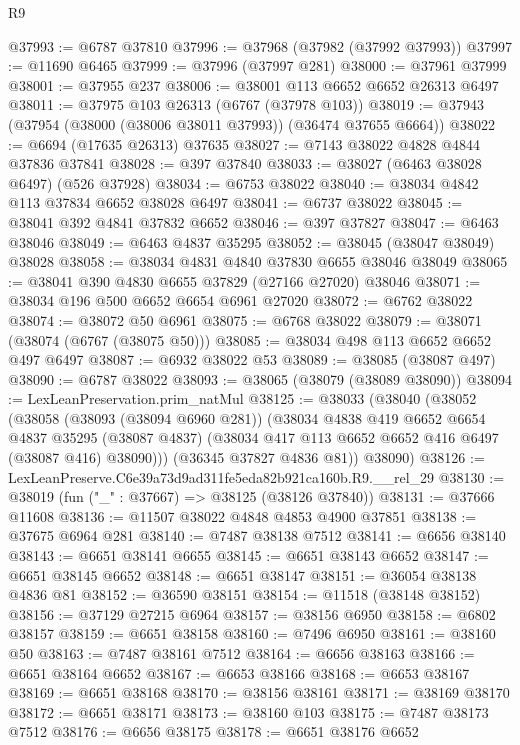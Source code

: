 \begin{lexlean}{R9}
\begin{coremodule}
@37993 := @6787 @37810
@37996 := @37968 (@37982 (@37992 @37993))
@37997 := @11690 @6465
@37999 := @37996 (@37997 @281)
@38000 := @37961 @37999
@38001 := @37955 @237
@38006 := @38001 @113 @6652 @6652 @26313 @6497
@38011 := @37975 @103 @26313 (@6767 (@37978 @103))
@38019 := @37943 (@37954 (@38000 (@38006 @38011 @37993)) (@36474 @37655 @6664))
@38022 := @6694 (@17635 @26313) @37635
@38027 := @7143 @38022 @4828 @4844 @37836 @37841
@38028 := @397 @37840
@38033 := @38027 (@6463 @38028 @6497) (@526 @37928)
@38034 := @6753 @38022
@38040 := @38034 @4842 @113 @37834 @6652 @38028 @6497
@38041 := @6737 @38022
@38045 := @38041 @392 @4841 @37832 @6652
@38046 := @397 @37827
@38047 := @6463 @38046
@38049 := @6463 @4837 @35295
@38052 := @38045 (@38047 @38049) @38028
@38058 := @38034 @4831 @4840 @37830 @6655 @38046 @38049
@38065 := @38041 @390 @4830 @6655 @37829 (@27166 @27020) @38046
@38071 := @38034 @196 @500 @6652 @6654 @6961 @27020
@38072 := @6762 @38022
@38074 := @38072 @50 @6961
@38075 := @6768 @38022
@38079 := @38071 (@38074 (@6767 (@38075 @50)))
@38085 := @38034 @498 @113 @6652 @6652 @497 @6497
@38087 := @6932 @38022 @53
@38089 := @38085 (@38087 @497)
@38090 := @6787 @38022
@38093 := @38065 (@38079 (@38089 @38090))
@38094 := LexLeanPreservation.prim_natMul
@38125 := @38033
    (@38040
      (@38052
        (@38058
          (@38093 (@38094 @6960 @281))
          (@38034
            @4838
            @419
            @6652
            @6654
            @4837
            @35295
            (@38087 @4837)
            (@38034 @417 @113 @6652 @6652 @416 @6497 (@38087 @416) @38090)))
        (@36345 @37827 @4836 @81))
      @38090)
@38126 := LexLeanPreserve.C6e39a73d9ad311fe5eda82b921ca160b.R9.__rel_29
@38130 := @38019 (fun ("_" : @37667) => @38125 (@38126 @37840))
@38131 := @37666 @11608
@38136 := @11507 @38022 @4848 @4853 @4900 @37851
@38138 := @37675 @6964 @281
@38140 := @7487 @38138 @7512
@38141 := @6656 @38140
@38143 := @6651 @38141 @6655
@38145 := @6651 @38143 @6652
@38147 := @6651 @38145 @6652
@38148 := @6651 @38147
@38151 := @36054 @38138 @4836 @81
@38152 := @36590 @38151
@38154 := @11518 (@38148 @38152)
@38156 := @37129 @27215 @6964
@38157 := @38156 @6950
@38158 := @6802 @38157
@38159 := @6651 @38158
@38160 := @7496 @6950
@38161 := @38160 @50
@38163 := @7487 @38161 @7512
@38164 := @6656 @38163
@38166 := @6651 @38164 @6652
@38167 := @6653 @38166
@38168 := @6653 @38167
@38169 := @6651 @38168
@38170 := @38156 @38161
@38171 := @38169 @38170
@38172 := @6651 @38171
@38173 := @38160 @103
@38175 := @7487 @38173 @7512
@38176 := @6656 @38175
@38178 := @6651 @38176 @6652

\end{coremodule}
\end{lexlean}
